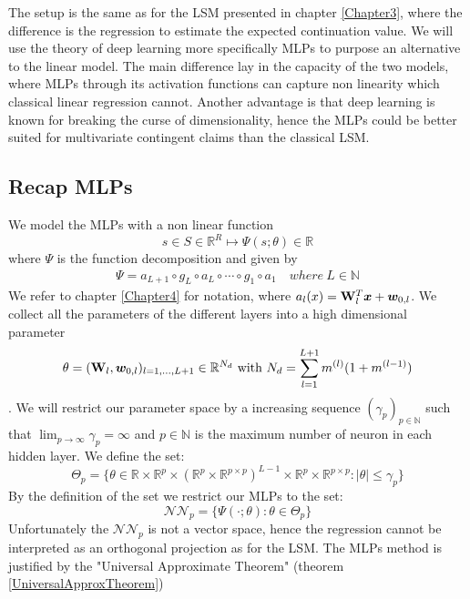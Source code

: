 The setup is the same as for the LSM presented in chapter \ref{Chapter3}, where the difference is the regression to estimate the expected continuation value. We will use the theory of deep learning more specifically MLPs to purpose an alternative to the linear model. The main difference lay in the capacity of the two models, where MLPs through its activation functions can capture non linearity which classical linear regression cannot. Another advantage is that deep learning is known for breaking the curse of dimensionality, hence the MLPs could be better suited for multivariate contingent claims than the classical LSM.

\subsection{Recap MLPs}
We model the MLPs with a non linear function 
$$s \in S \in \mathbb{R}^R \mapsto \Psi(s;\theta) \in \mathbb{R}$$
where $\Psi$ is the function decomposition and given by
\begin{align*}
\Psi = a_{L+1} \circ g_L \circ a_{L} \circ \cdots \circ g_1 \circ a_1 \quad where \ L\in \mathbb{N}
\end{align*}
We refer to chapter \ref{Chapter4} for notation, where $a_l(x)=\mathbf{W}_l^T \bm{x} + \bm{w}_{0,l}$. We collect all the parameters of the different layers into a high dimensional parameter
$$\theta=(\mathbf{W}_l, \bm{w}_{0,l})_{l=1,\ldots,L+1} \in \mathbb{R}^{N_d} \text{ with } N_d=\sum_{l=1}^{L+1} m^{(l)} (1+ m^{(l-1)})$$.
We will restrict our parameter space by a increasing sequence $(\gamma_p)_{p\in \mathbb{N}}$ such that $\lim_{p\to \infty} \gamma_p=\infty$ and $p\in \mathbb{N}$ is the maximum number of neuron in each hidden layer. We define the set:
$$\Theta_p = \{ \theta \in \mathbb{R} \times \mathbb{R}^p \times (\mathbb{R}^p \times \mathbb{R}^{p \times p})^{L-1} \times \mathbb{R}^{p} \times \mathbb{R}^{p \times p} : |\theta| \leq \gamma_p \}$$
By the definition of the set we restrict our MLPs to the set:
$$\mathcal{N} \mathcal{N}_p= \{ \Psi(\cdot;\theta) : \theta \in \Theta_p \}$$
Unfortunately the $\mathcal{N} \mathcal{N}_p$ is not a vector space, hence the regression cannot be interpreted as an orthogonal projection as for the LSM. The MLPs method is justified by the "Universal Approximate Theorem" (theorem \ref{UniversalApproxTheorem})

